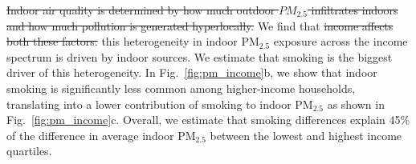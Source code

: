 \documentclass[reqno,12pt,notitlepage]{article}
\providecommand{\DIFadd}[1]{{\protect\color{BLUE}#1}} %
\providecommand{\DIFdel}[1]{{\protect\color{red}\sout{#1}}} %
\providecommand{\DIFaddbegin}{} %
\providecommand{\DIFaddend}{} %
\providecommand{\DIFdelbegin}{} %
\providecommand{\DIFdelend}{} %
\begin{document}
\DIFdelbegin \DIFdel{Indoor air quality is determined by how much outdoor $PM_{2.5}$ infiltrates indoors and how much pollution is generated hyperlocally. }\DIFdelend We find that \DIFdelbegin \DIFdel{income affects both these factors. }\DIFdelend \DIFaddbegin \DIFadd{this heterogeneity in indoor PM$_{2.5}$ exposure across the income spectrum is driven by indoor sources. We estimate that smoking is the biggest driver of this heterogeneity. In Fig.\ \ref{fig:pm_income}b, we show that indoor smoking is significantly less common among higher-income households, translating into a lower contribution of smoking to indoor PM$_{2.5}$ as shown in Fig.\ \ref{fig:pm_income}c. Overall, we estimate that smoking differences explain 45\% of the difference in average indoor PM$_{2.5}$ between the lowest and highest income quartiles.
}\DIFaddend 
\end{document}

